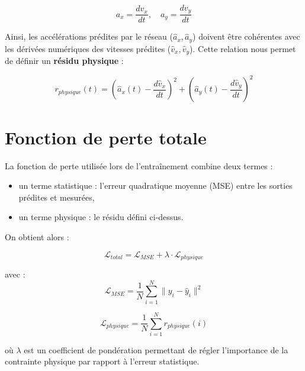 \documentclass[12pt, a4paper]{report}
\begin{document}
\begin{equation}
    a_x = \frac{d v_x}{dt}, \quad a_y = \frac{d v_y}{dt}
\end{equation}

Ainsi, les accélérations prédites par le réseau ($\hat{a}_x, \hat{a}_y$) doivent être cohérentes avec les dérivées numériques des vitesses prédites ($\hat{v}_x, \hat{v}_y$).  
Cette relation nous permet de définir un \textbf{résidu physique} :

\begin{equation}
    r_{physique}(t) = \left( \hat{a}_x(t) - \frac{d \hat{v}_x}{dt} \right)^2 
    + \left( \hat{a}_y(t) - \frac{d \hat{v}_y}{dt} \right)^2
\end{equation}

\section{Fonction de perte totale}

La fonction de perte utilisée lors de l’entraînement combine deux termes :
\begin{itemize}
    \item un terme statistique : l’erreur quadratique moyenne (MSE) entre les sorties prédites et mesurées,
    \item un terme physique : le résidu défini ci-dessus.
\end{itemize}

On obtient alors :

\begin{equation}
    \mathcal{L}_{total} = \mathcal{L}_{MSE} + \lambda \cdot \mathcal{L}_{physique}
\end{equation}

avec :
\begin{equation}
    \mathcal{L}_{MSE} = \frac{1}{N} \sum_{i=1}^{N} \| y_i - \hat{y}_i \|^2
\end{equation}

\begin{equation}
    \mathcal{L}_{physique} = \frac{1}{N} \sum_{i=1}^{N} r_{physique}(i)
\end{equation}

où $\lambda$ est un coefficient de pondération permettant de régler l’importance de la contrainte physique par rapport à l’erreur statistique.
\end{document}
